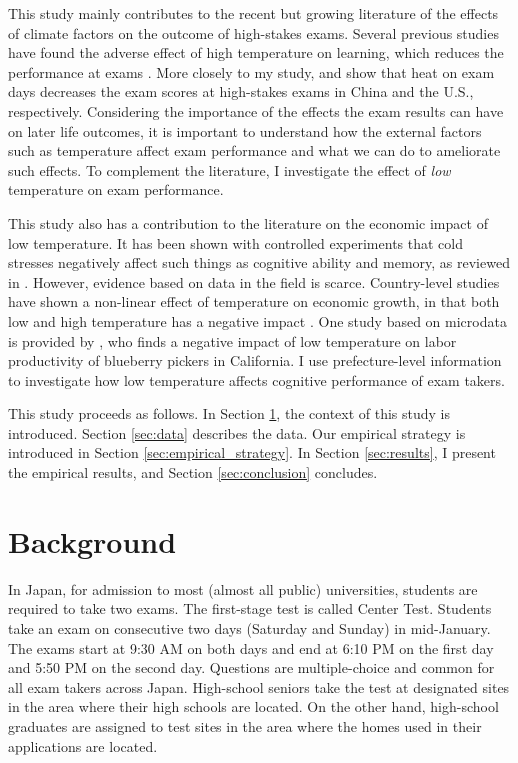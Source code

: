 \documentclass[12pt,letterpaper]{article}
\begin{document}
This study mainly contributes to the recent but growing literature of the effects of climate factors on the outcome of high-stakes exams.
Several previous studies have found the adverse effect of high temperature on learning, which reduces the performance at exams \citep{Park2020b, Cho2017}.
More closely to my study, \citet{GraffZivin2020} and \citet{Park2020a} show that heat on exam days decreases the exam scores at high-stakes exams in China and the U.S., respectively.
Considering the importance of the effects the exam results can have on later life outcomes, it is important to understand how the external factors such as temperature affect exam performance and what we can do to ameliorate such effects.
To complement the literature, I investigate the effect of \textit{low} temperature on exam performance.

This study also has a contribution to the literature on the economic impact of low temperature.
It has been shown with controlled experiments that cold stresses negatively affect such things as cognitive ability and memory, as reviewed in \citet{Taylor2016}.
However, evidence based on data in the field is scarce.
Country-level studies have shown a non-linear effect of temperature on economic growth, in that both low and high temperature has a negative impact \citep{Burke2015}.
One study based on microdata is provided by \citet{Stevens2017}, who finds a negative impact of low temperature on labor productivity of blueberry pickers in California.
I use prefecture-level information to investigate how low temperature affects cognitive performance of exam takers.

This study proceeds as follows.
In Section \ref{sec:background}, the context of this study is introduced.
Section \ref{sec:data} describes the data. 
Our empirical strategy is introduced in Section \ref{sec:empirical_strategy}.
In Section \ref{sec:results}, I present the empirical results, and Section \ref{sec:conclusion} concludes.
  
\section{Background}\label{sec:background}

In Japan, for admission to most (almost all public) universities, students are required to take two exams.
The first-stage test is called Center Test.
Students take an exam on consecutive two days (Saturday and Sunday) in mid-January.
The exams start at 9:30 AM on both days and end at 6:10 PM on the first day and 5:50 PM on the second day.
Questions are multiple-choice and common for all exam takers across Japan.
High-school seniors take the test at designated sites in the area where their high schools are located.
On the other hand, high-school graduates are assigned to test sites in the area where the homes used in their applications are located.
\end{document}
